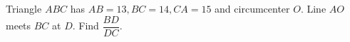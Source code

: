 Triangle $ABC$ has $AB=13,BC=14,CA=15$ and circumcenter $O$. Line $AO$ meets $BC$ at $D$. Find $\dfrac{BD}{DC}$.
